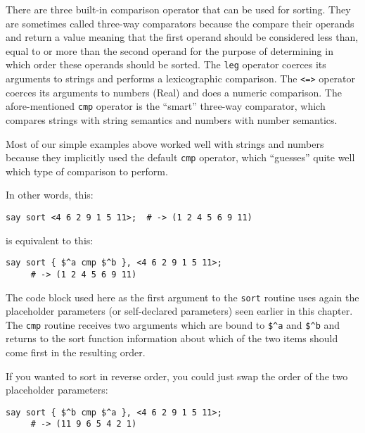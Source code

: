 There are three built-in comparison operator that can be used 
for sorting. They are sometimes called three-way comparators 
because the compare their operands and return a value meaning 
that the first operand should be considered less than, equal to 
or more than the second operand for the purpose of determining 
in which order these operands should be sorted. The {\tt leg} 
operator coerces its arguments to strings and performs a 
lexicographic comparison. The \verb'<=>' operator coerces 
its arguments to numbers (Real) and does a numeric comparison. 
The afore-mentioned {\tt cmp} operator is the ``smart'' 
three-way comparator, which compares strings with string 
semantics and numbers with number semantics.

Most of our simple examples above worked well with 
strings and numbers because they implicitly used the 
default {\tt cmp} operator, which ``guesses'' quite 
well which type of comparison to perform.

\ifplastex \else
{}
\fi



In other words, this:

\begin{verbatim}
say sort <4 6 2 9 1 5 11>;  # -> (1 2 4 5 6 9 11)
\end{verbatim}

is equivalent to this:

\begin{verbatim}
say sort { $^a cmp $^b }, <4 6 2 9 1 5 11>;
     # -> (1 2 4 5 6 9 11)
\end{verbatim}

The code block used here as the first argument to the 
{\tt sort} routine uses again the placeholder 
parameters (or self-declared parameters) seen earlier 
in this chapter. The {\tt cmp} routine receives two 
arguments which are bound to \verb'$^a' and \verb'$^b' 
and returns to the sort function information about which 
of the two items should come first in the resulting order.

If you wanted to sort in reverse order, you could just 
swap the order of the two placeholder parameters:

\begin{verbatim}
say sort { $^b cmp $^a }, <4 6 2 9 1 5 11>;
     # -> (11 9 6 5 4 2 1)
\end{verbatim}

